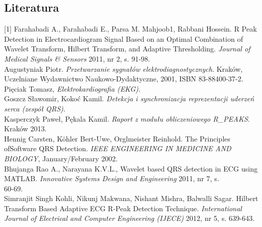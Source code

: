 \noindent {}

\newpage
\subsection{Literatura}
[1] Farahabadi A., Farahabadi E., Parsa M. Mahjoob1, Rabbani Hossein. R Peak Detection in Electrocardiogram Signal Based on an Optimal Combination of Wavelet Transform, Hilbert Transform, and Adaptive Thresholding. \textit{Journal of Medical Signals \& Sensors} 2011, nr 2, s. 91-98.\\

\noindent [2] Augustyniak Piotr. \textit{Przetwarzanie sygnałów elektrodiagnostycznych}. Kraków, Uczelniane Wydawnictwo Naukowo-Dydaktyczne, 2001, ISBN 83-88400-37-2.\\

\noindent [3] Pięciak Tomasz, \textit{Elektrokardiografia (EKG)}.\\

\noindent [4] Goszcz Sławomir, Kokoć Kamil. \textit{Detekcja i synchronizacja reprezentacji uderzeń serca (zespół QRS)}.\\

\noindent [5] Kasperczyk Paweł, Pękala Kamil. \textit{Raport z modułu obliczeniowego R\_PEAKS}. Kraków 2013.\\

\noindent [6] Hennig Carsten, Köhler Bert-Uwe, Orglmeister Reinhold. The Principles ofSoftware QRS Detection. \textit{IEEE ENGINEERING IN MEDICINE AND BIOLOGY}, January/February 2002.\\

\noindent [7] Bhujanga Rao A., Narayana K.V.L., Wavelet based QRS detection in ECG using MATLAB. \textit{Innovative Systems Design and Engineering} 2011, nr 7, s.\\ 60-69.\\

\noindent [8] Simranjit Singh Kohli, Nikunj Makwana, Nishant Mishra, Balwalli Sagar. Hilbert Transform Based Adaptive ECG R-Peak Detection Technique. \textit{International Journal of Electrical and Computer Engineering (IJECE)} 2012, nr 5, s. 639-643.